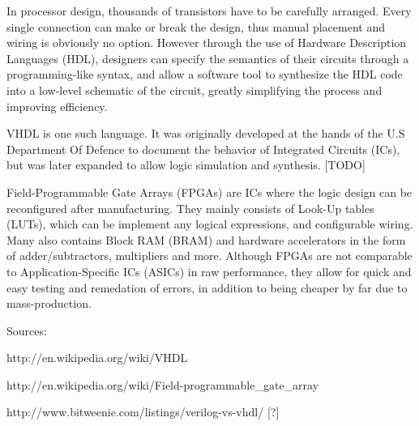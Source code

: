 In processor design, thousands of transistors have to be carefully arranged.
Every single connection can make or break the design, thus manual placement and wiring is obviously no option.
However through the use of Hardware Description Languages (HDL), designers can specify the semantics of their circuits through a programming-like syntax,
and allow a software tool to synthesize the HDL code into a low-level schematic of the circuit, greatly simplifying the process and improving efficiency.


VHDL is one such language.
It was originally developed at the hands of the U.S Department Of Defence to document the behavior of Integrated Circuits (ICs), but was later expanded to allow logic simulation and synthesis.
[TODO]


Field-Programmable Gate Arrays (FPGAs) are ICs where the logic design can be reconfigured after manufacturing.
They mainly consists of Look-Up tables (LUTs), which can be implement any logical expressions, and configurable wiring.
Many also contains Block RAM (BRAM) and hardware accelerators in the form of adder/subtractors, multipliers and more.
Although FPGAs are not comparable to Application-Specific ICs (ASICs) in raw performance, they allow for quick and easy testing and remedation of errors, in addition to being cheaper by far due to mass-production.


Sources:

http://en.wikipedia.org/wiki/VHDL

http://en.wikipedia.org/wiki/Field-programmable_gate_array

http://www.bitweenie.com/listings/verilog-vs-vhdl/ [?]
